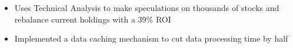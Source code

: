 \begin{itemize}
  \item Uses Technical Analysis to make speculations on thousands of stocks and rebalance current holdings with a 39\% ROI
  \item Implemented a data caching mechanism to cut data processing time by half
\end{itemize}